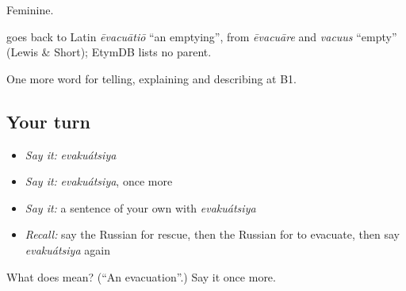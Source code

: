 Feminine.

\begin{cousinweb}
\emph{} goes back to Latin \emph{ēvacuātiō} \textquotedblleft{}an emptying\textquotedblright{}, from \emph{ēvacuāre} and \emph{vacuus} \textquotedblleft{}empty\textquotedblright{} (Lewis \& Short); EtymDB lists no parent.
\end{cousinweb}

\begin{grammarlens}[title={What you've built}]
One more word for telling, explaining and describing at B1.
\end{grammarlens}

\subsection*{Your turn}
\begin{itemize}
\raggedright
  \item \emph{Say it:} \emph{evakuátsiya}
  \item \emph{Say it:} \emph{evakuátsiya}, once more
  \item \emph{Say it:} a sentence of your own with \emph{evakuátsiya}
  \item \emph{Recall:} say the Russian for rescue, then the Russian for to evacuate, then say \emph{evakuátsiya} again
\end{itemize}

\begin{tcolorbox}[breakable,colback=teal!4,colframe=teal!35!black,title={Before you move on}]
What does  mean? (\textquotedblleft{}An evacuation\textquotedblright{}.) Say it once more.
\end{tcolorbox}
